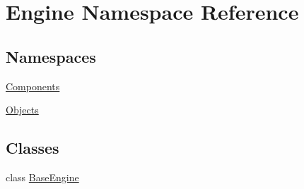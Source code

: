 \hypertarget{namespaceEngine}{}\section{Engine Namespace Reference}
\label{namespaceEngine}
\subsection*{Namespaces}
\begin{DoxyCompactItemize}
\item 
 \mbox{\hyperlink{namespaceEngine_1_1Components}{Components}}
\item 
 \mbox{\hyperlink{namespaceEngine_1_1Objects}{Objects}}
\end{DoxyCompactItemize}
\subsection*{Classes}
\begin{DoxyCompactItemize}
\item 
class \mbox{\hyperlink{classEngine_1_1BaseEngine}{Base\+Engine}}
\end{DoxyCompactItemize}
